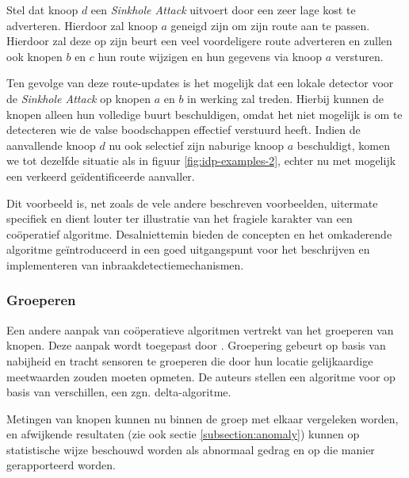 Stel dat knoop $d$ een \emph{Sinkhole Attack} uitvoert door een zeer lage kost
te adverteren. Hierdoor zal knoop $a$ geneigd zijn om zijn route aan te passen.
Hierdoor zal deze op zijn beurt een veel voordeligere route adverteren en
zullen ook knopen $b$ en $c$ hun route wijzigen en hun gegevens via knoop $a$
versturen.

Ten gevolge van deze route-updates is het mogelijk dat een lokale detector voor
de \emph{Sinkhole Attack} op knopen $a$ en $b$ in werking zal treden. Hierbij
kunnen de knopen alleen hun volledige buurt beschuldigen, omdat het niet
mogelijk is om te detecteren wie de valse boodschappen effectief verstuurd
heeft. Indien de aanvallende knoop $d$ nu ook selectief zijn naburige knoop $a$
beschuldigt, komen we tot dezelfde situatie als in figuur
\ref{fig:idp-examples-2}, echter nu met mogelijk een verkeerd
ge\"identificeerde aanvaller.

Dit voorbeeld is, net zoals de vele andere beschreven voorbeelden, uitermate
specifiek en dient louter ter illustratie van het fragiele karakter van een
co\"operatief algoritme. Desalniettemin bieden de concepten en het omkaderende
algoritme ge\"introduceerd in \citep{krontiris2009cooperative} een goed
uitgangspunt voor het beschrijven en implementeren van
inbraakdetectiemechanismen.

\subsubsection*{Groeperen}
\label{subsubsection:grouping}

Een andere aanpak van co\"operatieve algoritmen vertrekt van het groeperen van
knopen. Deze aanpak wordt toegepast door \citep{li2008group}. Groepering
gebeurt op basis van nabijheid en tracht sensoren te groeperen die door hun
locatie gelijkaardige meetwaarden zouden moeten opmeten. De auteurs stellen een
algoritme voor op basis van verschillen, een zgn. delta-algoritme.

Metingen van knopen kunnen nu binnen de groep met elkaar vergeleken worden, en
afwijkende resultaten (zie ook sectie \ref{subsection:anomaly}) kunnen op
statistische wijze beschouwd worden als abnormaal gedrag en op die manier
gerapporteerd worden.
